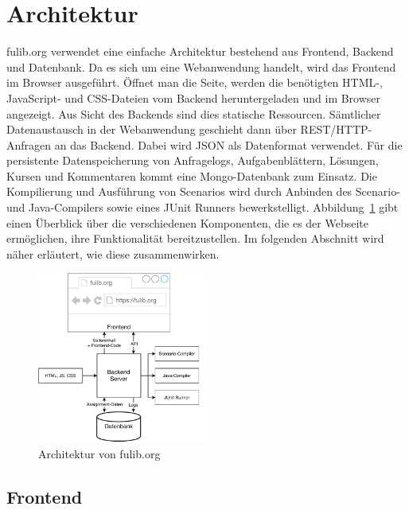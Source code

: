 \section{Architektur}\label{sec:architecture}

fulib.org verwendet eine einfache Architektur bestehend aus Frontend, Backend und Datenbank.
Da es sich um eine Webanwendung handelt, wird das Frontend im Browser ausgeführt.
Öffnet man die Seite, werden die benötigten HTML-, JavaScript- und CSS-Dateien vom Backend heruntergeladen und im Browser angezeigt.
Aus Sicht des Backends sind dies statische Ressourcen.
Sämtlicher Datenaustausch in der Webanwendung geschieht dann über REST/HTTP-Anfragen an das Backend.
Dabei wird JSON als Datenformat verwendet.
Für die persistente Datenspeicherung von Anfragelogs, Aufgabenblättern, Lösungen, Kursen und Kommentaren kommt eine Mongo\cite{mongodb}-Datenbank zum Einsatz.
Die Kompilierung und Ausführung von Scenarios wird durch Anbinden des Scenario- und Java-Compilers sowie eines JUnit Runners bewerkstelligt.
Abbildung~\ref{fig:website-architecture} gibt einen Überblick über die verschiedenen Komponenten,
die es der Webseite ermöglichen, ihre Funktionalität bereitzustellen.
Im folgenden Abschnitt wird näher erläutert, wie diese zusammenwirken.

\begin{figure}
    \centering
    \includegraphics[width=0.5\textwidth]{chapter/fulib.org/img/architecture.pdf}
    \caption{Architektur von fulib.org}
    \label{fig:website-architecture}
\end{figure}

\subsection{Frontend}\label{subsec:frontend}

